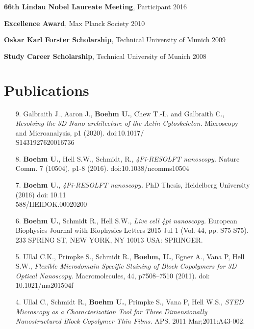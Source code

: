 \documentclass[margin,line]{res}
\begin{document}
\begin{resume}
\vspace*{-3mm}
{\bf 66th Lindau Nobel Laureate Meeting}, Participant \hfill {2016}

\vspace*{-3mm}
{\bf Excellence Award}, Max Planck Society \hfill 2010

\vspace*{-3mm}
{\bf Oskar Karl Forster Scholarship}, Technical University of Munich  \hfill 2009

\vspace*{-3mm}
{\bf Study Career Scholarship}, Technical University of Munich  \hfill 2008


\section{\sc Publications}

\begin{enumerate}[leftmargin=*]

\item[9.] Galbraith J., Aaron J., {\bf Boehm U.}, Chew T.-L. and Galbraith C., {\it Resolving the 3D Nano-architecture of the Actin Cytoskeleton.} Microscopy and Microanalysis, p1 (2020). doi:10.1017/\\S1431927620016736
\item[8.]  {\bf Boehm U.}, Hell S.W., Schmidt, R., {\it 4Pi-RESOLFT nanoscopy.} Nature Comm. 7 (10504), p1-8 (2016). doi:10.1038/ncomms10504

\item[7.] {\bf Boehm U.},  {\it 4Pi-RESOLFT nanoscopy.} PhD Thesis, Heidelberg University (2016) doi: 10.11\\588/HEIDOK.00020200

\item[6.] {\bf Boehm U.}, Schmidt R., Hell S.W., {\it Live cell 4pi nanoscopy.} European Biophysics Journal with Biophysics Letters 2015 Jul 1 (Vol. 44, pp. S75-S75). 233 SPRING ST, NEW YORK, NY 10013 USA: SPRINGER.

\item[5.] Ullal C.K., Primpke S., Schmidt R., {\bf Boehm, U.}, Egner A., Vana P, Hell S.W., {\it Flexible Microdomain Specific Staining of Block Copolymers for 3D Optical Nanoscopy.} Macromolecules, 44, p7508–7510 (2011). doi: 10.1021/ma201504f

\item[4.] Ullal C., Schmidt R., {\bf  Boehm U.}, Primpke S., Vana P, Hell W.S.,  {\it STED Microscopy as a Characterization Tool for Three Dimensionally Nanostructured Block Copolymer Thin Films.} APS. 2011 Mar;2011:A43-002.


\end{enumerate}
\end{resume}
\end{document}
